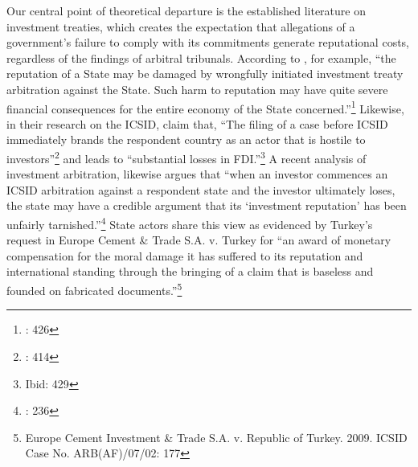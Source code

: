 \documentclass[12pt,onesided]{amsart}
\begin{document}
Our central point of theoretical departure is the established literature on investment treaties, which creates the expectation that allegations of a government's failure to comply with its commitments generate reputational costs, regardless of the findings of arbitral tribunals. According to \citeauthor{schwenzer:hachem:2011}, for example, ``the reputation of a State may be damaged by wrongfully initiated investment treaty arbitration against the State. Such harm to reputation may have quite severe financial consequences for the entire economy of the State concerned.''\footnote{\citet{schwenzer:hachem:2011}: 426} Likewise, in their research on the ICSID, \citeauthor{allee:peinhardt:2011} claim that, ``The filing of a case before ICSID immediately brands the respondent country as an actor that is hostile to investors''\footnote{\citet{allee:peinhardt:2011}: 414} and leads to ``substantial losses in FDI.''\footnote{Ibid: 429} A recent analysis of investment arbitration, likewise argues that ``when an investor commences an ICSID arbitration against a respondent state and the investor ultimately loses, the state may have a credible argument that its `investment reputation' has been unfairly tarnished.''\footnote{\citet{parish2011awarding}: 236} State actors share this view as evidenced by Turkey's request in Europe Cement \& Trade S.A. v. Turkey for ``an award of monetary compensation for the moral damage it has suffered to its reputation and international standing through the bringing of a claim that is baseless and founded on fabricated documents.''\footnote{Europe Cement Investment \& Trade S.A. v. Republic of Turkey. 2009. ICSID Case No. ARB(AF)/07/02: 177} 
\end{document}
